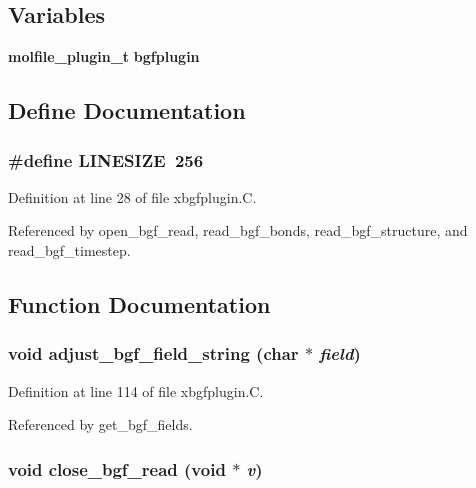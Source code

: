 \subsection*{Variables}
\begin{CompactItemize}
\item 
{\bf molfile\_\-plugin\_\-t} {\bf bgfplugin}
\end{CompactItemize}


\subsection{Define Documentation}
\subsubsection{\setlength{\rightskip}{0pt plus 5cm}\#define LINESIZE\ 256}\label{xbgfplugin_8C_a0}




Definition at line 28 of file xbgfplugin.C.

Referenced by open\_\-bgf\_\-read, read\_\-bgf\_\-bonds, read\_\-bgf\_\-structure, and read\_\-bgf\_\-timestep.

\subsection{Function Documentation}
\subsubsection{\setlength{\rightskip}{0pt plus 5cm}void adjust\_\-bgf\_\-field\_\-string (char $\ast$ {\em field})\hspace{0.3cm}{\tt  [static]}}\label{xbgfplugin_8C_a3}




Definition at line 114 of file xbgfplugin.C.

Referenced by get\_\-bgf\_\-fields.
\subsubsection{\setlength{\rightskip}{0pt plus 5cm}void close\_\-bgf\_\-read (void $\ast$ {\em v})\hspace{0.3cm}{\tt  [static]}}\label{xbgfplugin_8C_a15}




